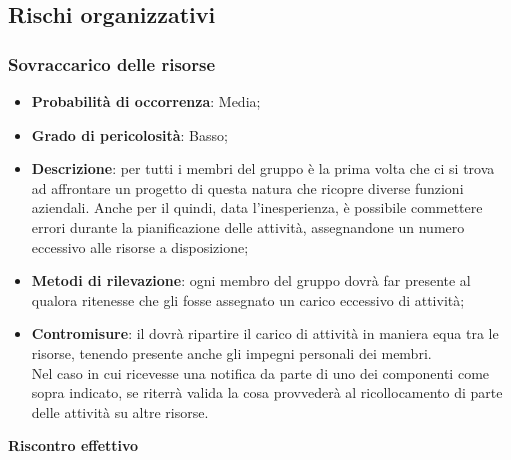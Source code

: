 
	\subsection{Rischi organizzativi} %
	\label{sub:rischi_organizzativi}
		\subsubsection{Sovraccarico delle risorse} %
		\label{ssub:sovraccarico_delle_risorse}
			\begin{itemize}
				\item \textbf{Probabilità di occorrenza}: Media;
				\item \textbf{Grado di pericolosità}: Basso;
				\item \textbf{Descrizione}: per tutti i membri del gruppo è la prima volta che ci si trova ad affrontare un progetto di questa natura che ricopre diverse funzioni aziendali. Anche per il \roleProjectManager{} quindi, data l'inesperienza, è possibile commettere errori durante la pianificazione delle attività, assegnandone un numero eccessivo alle risorse a disposizione;
				\item \textbf{Metodi di rilevazione}: ogni membro del gruppo dovrà far presente al \roleProjectManager{} qualora ritenesse che gli fosse assegnato un carico eccessivo di attività;
				\item \textbf{Contromisure}: il \roleProjectManager{} dovrà ripartire il carico di attività in maniera equa tra le risorse, tenendo presente anche gli impegni personali dei membri. \\
				Nel caso in cui ricevesse una notifica da parte di uno dei componenti come sopra indicato, se riterrà valida la cosa provvederà al ricollocamento di parte delle attività su altre risorse.
			\end{itemize}
		\noindent
		\textbf{Riscontro effettivo}

